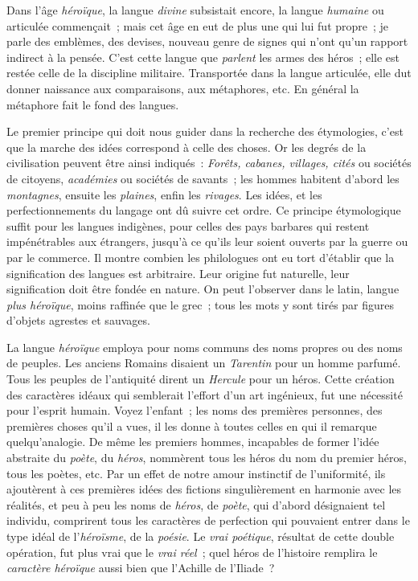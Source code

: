 \documentclass[french,twoside]{book} %
\begin{document}
Dans l’âge {\itshape héroïque}, la langue {\itshape divine} subsistait encore, la langue {\itshape humaine} ou articulée commençait ; mais cet âge en eut de plus une qui lui fut propre ; je parle des emblèmes, des devises, nouveau genre de signes qui n’ont qu’un rapport indirect à la pensée. C’est cette langue que {\itshape parlent} les armes des héros ; elle est restée celle de la discipline  militaire. Transportée dans la langue articulée, elle dut donner naissance aux comparaisons, aux métaphores, etc. En général la métaphore fait le fond des langues.\par
Le premier principe qui doit nous guider dans la recherche des étymologies, c’est que la marche des idées correspond à celle des choses. Or les degrés de la civilisation peuvent être ainsi indiqués : {\itshape Forêts, cabanes, villages, cités} ou sociétés de citoyens, {\itshape académies} ou sociétés de savants ; les hommes habitent d’abord les {\itshape montagnes}, ensuite les {\itshape plaines}, enfin les {\itshape rivages}. Les idées, et les perfectionnements du langage ont dû suivre cet ordre. Ce principe étymologique suffit pour les langues indigènes, pour celles des pays barbares qui restent impénétrables aux étrangers, jusqu’à ce qu’ils leur soient ouverts par la guerre ou par le commerce. Il montre combien les philologues ont eu tort d’établir que la signification des langues est arbitraire. Leur origine fut naturelle, leur signification doit être fondée en nature. On peut l’observer dans le latin, langue {\itshape plus héroïque}, moins raffinée que le grec ; tous les mots y sont tirés par figures d’objets agrestes et sauvages.\par
La langue {\itshape héroïque} employa pour noms communs des noms propres ou des noms de peuples. Les anciens Romains disaient un {\itshape Tarentin} pour un  homme parfumé. Tous les peuples de l’antiquité dirent un {\itshape Hercule} pour un héros. Cette création des caractères idéaux qui semblerait l’effort d’un art ingénieux, fut une nécessité pour l’esprit humain. Voyez l’enfant ; les noms des premières personnes, des premières choses qu’il a vues, il les donne à toutes celles en qui il remarque quelqu’analogie. De même les premiers hommes, incapables de former l’idée abstraite du {\itshape poète}, du {\itshape héros}, nommèrent tous les héros du nom du premier héros, tous les poètes, etc. Par un effet de notre amour instinctif de l’uniformité, ils ajoutèrent à ces premières idées des fictions singulièrement en harmonie avec les réalités, et peu à peu les noms de {\itshape héros}, de {\itshape poète}, qui d’abord désignaient tel individu, comprirent tous les caractères de perfection qui pouvaient entrer dans le type idéal de l’{\itshape héroïsme}, de la {\itshape poésie}. Le {\itshape vrai poétique}, résultat de cette double opération, fut plus vrai que le {\itshape vrai réel} ; quel héros de l’histoire remplira le {\itshape caractère héroïque} aussi bien que l’Achille de l’Iliade ?\par
\end{document}
